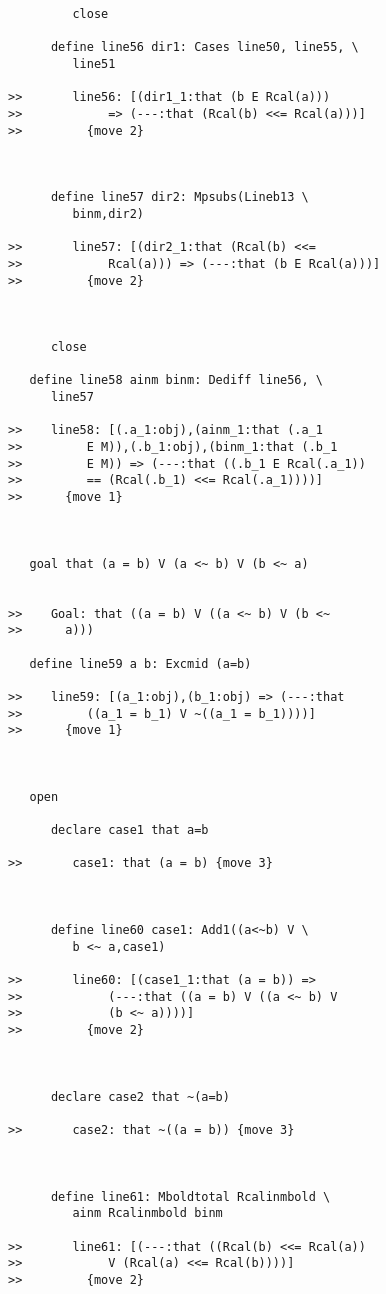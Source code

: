 \documentclass[12pt]{article}
\begin{document}
\begin{verbatim}
         close

      define line56 dir1: Cases line50, line55, \
         line51

>>       line56: [(dir1_1:that (b E Rcal(a)))
>>            => (---:that (Rcal(b) <<= Rcal(a)))]
>>         {move 2}



      define line57 dir2: Mpsubs(Lineb13 \
         binm,dir2)

>>       line57: [(dir2_1:that (Rcal(b) <<=
>>            Rcal(a))) => (---:that (b E Rcal(a)))]
>>         {move 2}



      close

   define line58 ainm binm: Dediff line56, \
      line57

>>    line58: [(.a_1:obj),(ainm_1:that (.a_1
>>         E M)),(.b_1:obj),(binm_1:that (.b_1
>>         E M)) => (---:that ((.b_1 E Rcal(.a_1))
>>         == (Rcal(.b_1) <<= Rcal(.a_1))))]
>>      {move 1}



   goal that (a = b) V (a <~ b) V (b <~ a)


>>    Goal: that ((a = b) V ((a <~ b) V (b <~
>>      a)))

   define line59 a b: Excmid (a=b)

>>    line59: [(a_1:obj),(b_1:obj) => (---:that
>>         ((a_1 = b_1) V ~((a_1 = b_1))))]
>>      {move 1}



   open

      declare case1 that a=b

>>       case1: that (a = b) {move 3}



      define line60 case1: Add1((a<~b) V \
         b <~ a,case1)

>>       line60: [(case1_1:that (a = b)) =>
>>            (---:that ((a = b) V ((a <~ b) V
>>            (b <~ a))))]
>>         {move 2}



      declare case2 that ~(a=b)

>>       case2: that ~((a = b)) {move 3}



      define line61: Mboldtotal Rcalinmbold \
         ainm Rcalinmbold binm

>>       line61: [(---:that ((Rcal(b) <<= Rcal(a))
>>            V (Rcal(a) <<= Rcal(b))))]
>>         {move 2}




\end{verbatim}
\end{document}
